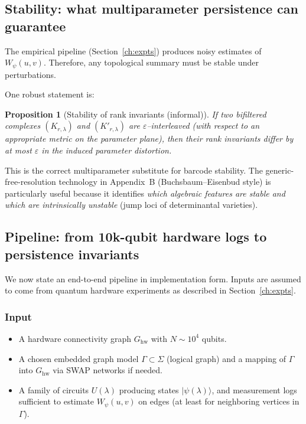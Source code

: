 \documentclass[11pt,oneside]{amsbook}
\numberwithin{equation}{section}
\theoremstyle{plain}
\newtheorem{proposition}[theorem]{Proposition}
\theoremstyle{definition}
\theoremstyle{remark}
\begin{document}
\subsection{Stability: what multiparameter persistence can guarantee}
\label{sec:stability}

The empirical pipeline (Section~\ref{ch:expts}) produces noisy estimates of $W_\psi(u,v)$.
Therefore, any topological summary must be stable under perturbations.

One robust statement is:

\begin{proposition}[Stability of rank invariants (informal)]
If two bifiltered complexes $(K_{r,\lambda})$ and $(K'_{r,\lambda})$ are $\varepsilon$--interleaved (with respect to an appropriate metric on the parameter plane), then their rank invariants differ by at most $\varepsilon$ in the induced parameter distortion.
\end{proposition}

This is the correct multiparameter substitute for barcode stability.
The generic-free-resolution technology in Appendix~B (Buchsbaum--Eisenbud style) is particularly useful because it identifies \emph{which algebraic features are stable and which are intrinsically unstable} (jump loci of determinantal varieties).

\subsection{Pipeline: from 10k-qubit hardware logs to persistence invariants}
\label{sec:pipeline}

We now state an end-to-end pipeline in implementation form.
Inputs are assumed to come from quantum hardware experiments as described in Section~\ref{ch:expts}.

\subsubsection*{Input}
\begin{itemize}
\item A hardware connectivity graph $G_{\mathrm{hw}}$ with $N\sim 10^4$ qubits.
\item A chosen embedded graph model $\Gamma\subset \Sigma$ (logical graph) and a mapping of $\Gamma$ into $G_{\mathrm{hw}}$ via SWAP networks if needed.
\item A family of circuits $U(\lambda)$ producing states $|\psi(\lambda)\rangle$, and measurement logs sufficient to estimate $W_\psi(u,v)$ on edges (at least for neighboring vertices in $\Gamma$).
\end{itemize}
\end{document}
